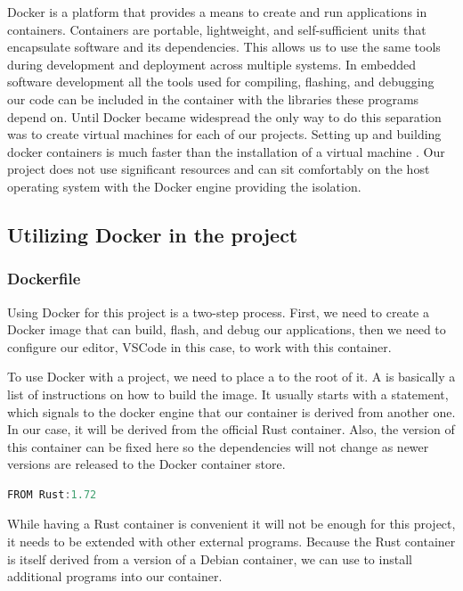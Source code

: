 Docker is a platform that provides a means to create and run applications in containers. Containers are portable, lightweight, and self-sufficient units that encapsulate software and its dependencies. This allows us to use the same tools during development and deployment across multiple systems. In embedded software development all the tools used for compiling, flashing, and debugging our code can be included in the container with the libraries these programs depend on. Until Docker became widespread the only way to do this separation was to create virtual machines for each of our projects. Setting up and building docker containers is much faster than the installation of a virtual machine \cite{VMVsDocker}. Our project does not use significant resources and can sit comfortably on the host operating system with the Docker engine providing the isolation.

\subsection{Utilizing Docker in the project}

\subsubsection{Dockerfile}

Using Docker for this project is a two-step process. First, we need to create a Docker image that can build, flash, and debug our applications, then we need to configure our editor, VSCode in this case, to work with this container.

To use Docker with a project, we need to place a  to the root of it. A  is basically a list of instructions on how to build the image. It usually starts with a  statement, which signals to the docker engine that our container is derived from another one. In our case, it will be derived from the official Rust container. Also, the version of this container can be fixed here so the dependencies will not change as newer versions are released to the Docker container store.

\begin{lstlisting}[language=C,frame=single,float=!ht,label={lst:from-rust},caption={Deriving from Rust Container}]
    FROM Rust:1.72
\end{lstlisting}

While having a Rust container is convenient it will not be enough for this project, it needs to be extended with other external programs. Because the Rust container is itself derived from a version of a Debian container, we can use  to install additional programs into our container.

